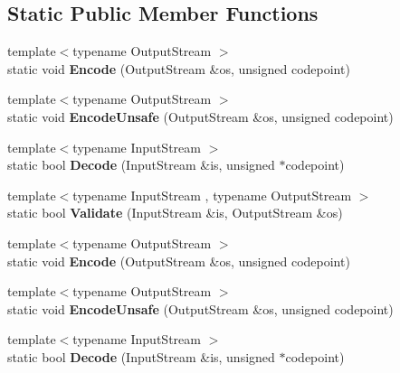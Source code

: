 \subsection*{Static Public Member Functions}
\begin{DoxyCompactItemize}
\item 
{\footnotesize template$<$typename Output\+Stream $>$ }\\static void {\bfseries Encode} (Output\+Stream \&os, unsigned codepoint)\hypertarget{struct_u_t_f32_a511d1b09672ce535085895a28d8c2f13}{}\label{struct_u_t_f32_a511d1b09672ce535085895a28d8c2f13}

\item 
{\footnotesize template$<$typename Output\+Stream $>$ }\\static void {\bfseries Encode\+Unsafe} (Output\+Stream \&os, unsigned codepoint)\hypertarget{struct_u_t_f32_ae50dd8dff92c36ee184c6d4eccb1961e}{}\label{struct_u_t_f32_ae50dd8dff92c36ee184c6d4eccb1961e}

\item 
{\footnotesize template$<$typename Input\+Stream $>$ }\\static bool {\bfseries Decode} (Input\+Stream \&is, unsigned $\ast$codepoint)\hypertarget{struct_u_t_f32_a6e7258a5e982e101345dffdc355e9b53}{}\label{struct_u_t_f32_a6e7258a5e982e101345dffdc355e9b53}

\item 
{\footnotesize template$<$typename Input\+Stream , typename Output\+Stream $>$ }\\static bool {\bfseries Validate} (Input\+Stream \&is, Output\+Stream \&os)\hypertarget{struct_u_t_f32_a71336fb0546b3079e01bbd51d2fa2e45}{}\label{struct_u_t_f32_a71336fb0546b3079e01bbd51d2fa2e45}

\item 
{\footnotesize template$<$typename Output\+Stream $>$ }\\static void {\bfseries Encode} (Output\+Stream \&os, unsigned codepoint)\hypertarget{struct_u_t_f32_a511d1b09672ce535085895a28d8c2f13}{}\label{struct_u_t_f32_a511d1b09672ce535085895a28d8c2f13}

\item 
{\footnotesize template$<$typename Output\+Stream $>$ }\\static void {\bfseries Encode\+Unsafe} (Output\+Stream \&os, unsigned codepoint)\hypertarget{struct_u_t_f32_ae50dd8dff92c36ee184c6d4eccb1961e}{}\label{struct_u_t_f32_ae50dd8dff92c36ee184c6d4eccb1961e}

\item 
{\footnotesize template$<$typename Input\+Stream $>$ }\\static bool {\bfseries Decode} (Input\+Stream \&is, unsigned $\ast$codepoint)\hypertarget{struct_u_t_f32_a6e7258a5e982e101345dffdc355e9b53}{}\label{struct_u_t_f32_a6e7258a5e982e101345dffdc355e9b53}


\end{DoxyCompactItemize}
